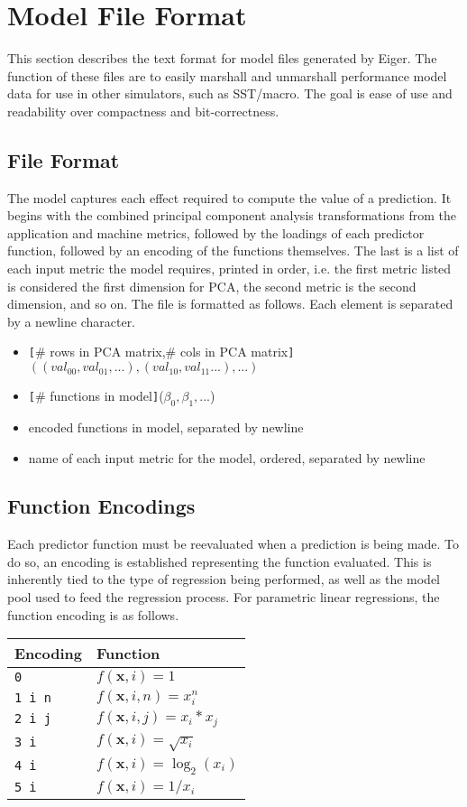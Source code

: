 \section{Model File Format}
\label{sec:modelfile}
This section describes the text format for model files generated by Eiger. The function of these files are to easily marshall and unmarshall performance model data for use in other simulators, such as SST/macro. The goal is ease of use and readability over compactness and bit-correctness.
\subsection{File Format}
The model captures each effect required to compute the value of a prediction. It begins with the combined principal component analysis transformations from the application and machine metrics, followed by the loadings of each predictor function, followed by an encoding of the functions themselves. The last is a list of each input metric the model requires, printed in order, i.e. the first metric listed is considered the first dimension for PCA, the second metric is the second dimension, and so on. The file is formatted as follows. Each element is separated by a newline character.
	\begin{itemize}
	\item \texttt{[}\# rows in PCA matrix,\# cols in PCA matrix\texttt{]}$((val_{00},val_{01},...),(val_{10},val_{11}...),...)$
	\item \texttt{[}\# functions in model\texttt{]}($\beta_0,\beta_1,...$)
	\item encoded functions in model, separated by newline
	\item name of each input metric for the model, ordered, separated by newline
	\end{itemize}

\subsection{Function Encodings}
Each predictor function must be reevaluated when a prediction is being made. To do so, an encoding is established representing the function evaluated. This is inherently tied to the type of regression being performed, as well as the model pool used to feed the regression process. For parametric linear regressions, the function encoding is as follows.
	\begin{table}[h]
	\centering
	\begin{tabular}{|l|l|}
	\hline
	Encoding & Function \\
	\hline
	\texttt{0} & $f(\mathbf{x},i) = 1$ \\
	\hline
	\texttt{1 i n} & $f(\mathbf{x},i,n) = x_i^n$ \\
	\hline
	\texttt{2 i j} & $f(\mathbf{x},i,j) = x_i * x_j$ \\
	\hline
	\texttt{3 i} & $f(\mathbf{x},i) = \sqrt{x_i}$ \\
	\hline
	\texttt{4 i} & $f(\mathbf{x},i) = \log_2(x_i)$ \\
	\hline
	\texttt{5 i} & $f(\mathbf{x},i) = 1/x_i$ \\
	\hline
	\end{tabular}
	\end{table}
